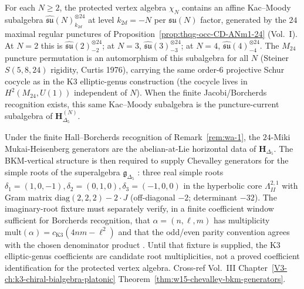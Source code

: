 \begin{remark}
\label{rem:wa-kmN}
For each $N \ge 2$, the protected vertex algebra $\chi_N$ contains an
affine Kac--Moody subalgebra
$\widehat{\mathfrak{su}}(N)_{k_{2d}}^{\otimes 24}$ at level
$k_{2d} = -N$ per $\mathfrak{su}(N)$ factor, generated by the
$24$ maximal regular punctures of
Proposition~\ref{prop:thqg-occ-CD-ANm1-24} (Vol.~I). At $N = 2$
this is $\widehat{\mathfrak{su}}(2)_{-2}^{\otimes 24}$;
at $N = 3$, $\widehat{\mathfrak{su}}(3)_{-3}^{\otimes 24}$;
at $N = 4$, $\widehat{\mathfrak{su}}(4)_{-4}^{\otimes 24}$. The
$M_{24}$ puncture permutation is an automorphism of this
subalgebra for all $N$ (Steiner $S(5, 8, 24)$ rigidity,
Curtis 1976), carrying the same order-$6$ projective Schur
cocycle as in the K3 elliptic-genus construction (the cocycle lives in
$H^2(M_{24}, U(1))$ independent of $N$).
When the finite Jacobi/Borcherds recognition exists, this same
Kac--Moody subalgebra is the puncture-current subalgebra of
$\mathbf H^{(N)}_{\Delta_5}$.
\end{remark}


\begin{remark}
\label{rem:wa-3-supplement}
Under the finite Hall--Borcherds recognition of
Remark~\ref{rem:wa-1}, the $24$-Miki Mukai-Heisenberg generators are the
abelian-at-Lie horizontal data of $\mathbf H_{\Delta_5}$. The
BKM-vertical structure is then required to supply Chevalley generators
for the simple roots of the superalgebra $\mathfrak g_{\Delta_5}$
\cite{GritsenkoNikulin1998}: three real simple roots
$\delta_1=(1,0,-1), \delta_2=(0,1,0), \delta_3=(-1,0,0)$ in the
hyperbolic core $\Lambda^{2,1}_{II}$ with Gram matrix
$\mathrm{diag}(2,2,2)-2\cdot J$ (off-diagonal $-2$; determinant $-32$).
The imaginary-root fixture must separately verify, in a finite
coefficient window sufficient for Borcherds recognition, that
$\alpha=(n,\ell,m)$ has multiplicity
$\mathrm{mult}(\alpha)=c_{\mathrm{K3}}(4nm-\ell^2)$ and that the
odd/even parity convention agrees with the chosen denominator product
\cite{EguchiOoguriTachikawa2011}. Until that fixture is supplied, the
K3 elliptic-genus coefficients are candidate root multiplicities, not a
proved coefficient identification for the protected vertex algebra.
Cross-ref Vol.~III Chapter~\ref{V3-ch:k3-chiral-bialgebra-platonic}
Theorem~\ref{thm:w15-chevalley-bkm-generators}.
\end{remark}

